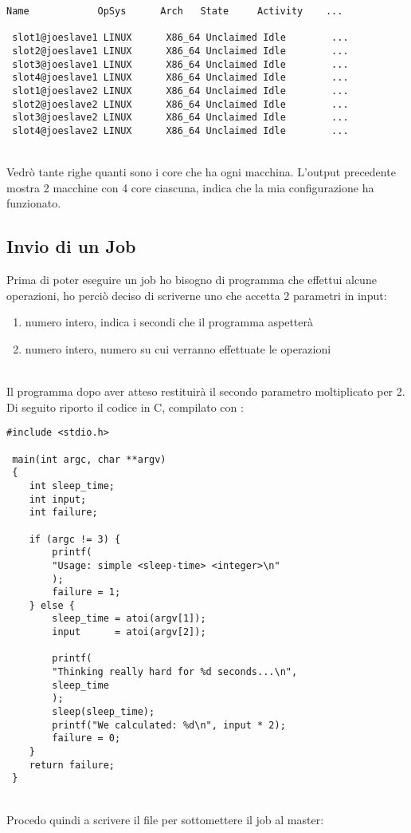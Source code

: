 \begin{lstlisting}[style=output]
 Name            OpSys      Arch   State     Activity    ...
 
 slot1@joeslave1 LINUX      X86_64 Unclaimed Idle        ...
 slot2@joeslave1 LINUX      X86_64 Unclaimed Idle        ...
 slot3@joeslave1 LINUX      X86_64 Unclaimed Idle        ...
 slot4@joeslave1 LINUX      X86_64 Unclaimed Idle        ...
 slot1@joeslave2 LINUX      X86_64 Unclaimed Idle        ...
 slot2@joeslave2 LINUX      X86_64 Unclaimed Idle        ...
 slot3@joeslave2 LINUX      X86_64 Unclaimed Idle        ...
 slot4@joeslave2 LINUX      X86_64 Unclaimed Idle        ...
\end{lstlisting}
\ \\
Vedr\`{o} tante righe quanti sono i core che ha ogni macchina. L'output precedente mostra 2 macchine con 4 core ciascuna, indica che la mia configurazione ha funzionato.

\subsection{Invio di un Job}

Prima di poter eseguire un job ho bisogno di programma che effettui alcune operazioni, ho perci\`{o} deciso di scriverne uno che accetta 2 parametri in input:

\begin{enumerate}
	\item numero intero, indica i secondi che il programma aspetter\`{a}
	\item numero intero, numero su cui verranno effettuate le operazioni
\end{enumerate}
\ \\
Il programma dopo aver atteso restituir\`{a} il secondo parametro moltiplicato per 2.\\
Di seguito riporto il codice in C, compilato con :

\begin{lstlisting}[style=cmd]
 #include <stdio.h>
 
 main(int argc, char **argv)
 {
	int sleep_time;
	int input;
	int failure;
	
	if (argc != 3) {
		printf(
		"Usage: simple <sleep-time> <integer>\n"
		);
		failure = 1;
	} else {
		sleep_time = atoi(argv[1]);
		input      = atoi(argv[2]);
		
		printf(
		"Thinking really hard for %d seconds...\n",
		sleep_time
		);
		sleep(sleep_time);
		printf("We calculated: %d\n", input * 2);
		failure = 0;
	}
	return failure;
 }
\end{lstlisting}
\ \\
Procedo quindi a scrivere il file  per sottomettere il job al master: 

